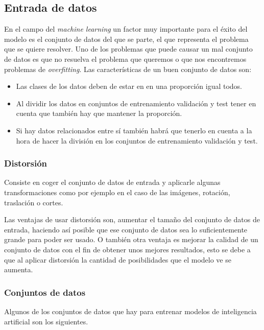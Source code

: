 \documentclass[12pt,a4paper]{article}
\begin{document}

\subsection{Entrada de datos}
En el campo del \textit{machine learning} un factor muy importante para el éxito del modelo es el conjunto de datos del que se parte, el que representa el problema que se quiere resolver. Uno de los problemas que puede causar un mal conjunto de datos es que no resuelva el problema que queremos o que nos encontremos problemas de \textit{overfitting}. Las características de un buen conjunto de datos son:

\begin{itemize}
\item Las clases de los datos deben de estar en en una proporción igual todos.
\item Al dividir los datos en conjuntos de entrenamiento validación y test tener en cuenta que también hay que mantener la proporción.
\item Si hay datos relacionados entre sí también habrá que tenerlo en cuenta a la hora de hacer la división en los conjuntos de entrenamiento validación y test.

\end{itemize}

\subsubsection{Distorsión}
Consiste en coger el conjunto de datos de entrada y aplicarle algunas transformaciones como por ejemplo en el caso de las imágenes, rotación, traslación o cortes.
\bigskip

Las ventajas de usar distorsión son, aumentar el tamaño del conjunto de datos de entrada, haciendo así posible que ese conjunto de datos sea lo suficientemente grande para poder ser usado. O también otra ventaja es mejorar la calidad de un conjunto de datos con el fin de obtener unos mejores resultados, esto se debe a que al aplicar distorsión la cantidad de posibilidades que el modelo ve se aumenta.


\subsubsection{Conjuntos de datos}
Algunos de los conjuntos de datos que hay para entrenar modelos de inteligencia artificial son los siguientes.
\end{document}

